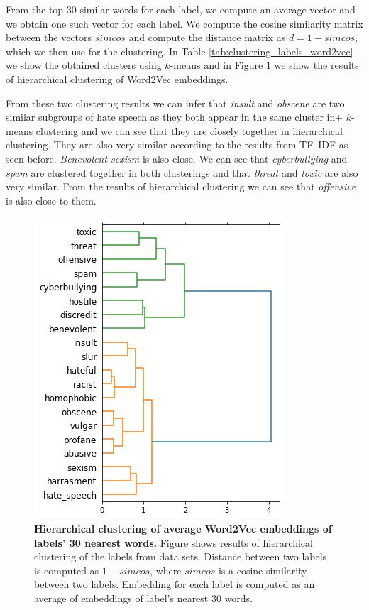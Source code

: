 \documentclass[fleqn,moreauthors,10pt]{ds_report}
\begin{document}
From the top 30 similar words for each label, we compute an average vector and we obtain one such vector for each label. We compute the cosine similarity matrix between the vectors $simcos$ and compute the distance matrix as $d = 1 - simcos$, which we then use for the clustering. In Table \ref{tab:clustering_labels_word2vec} we show the obtained clusters using $k$-means and in Figure \ref{fig:hier} we show the results of hierarchical clustering of Word2Vec embeddings.

From these two clustering results we can infer that \textit{insult} and \textit{obscene} are two similar subgroups of hate speech as they both appear in the same cluster in+ $k$-means clustering and we can see that they are closely together in hierarchical clustering. They are also very similar according to the results from TF--IDF as seen before. \textit{Benevolent sexism} is also close. We can see that \textit{cyberbullying} and \textit{spam} are clustered together in both clusterings and that \textit{threat} and \textit{toxic} are also very similar. From the results of hierarchical clustering we can see that \textit{offensive} is also close to them.

\begin{figure}[htb]\centering
	\includegraphics[width=0.6\linewidth]{hier.png}
	\caption{\textbf{Hierarchical clustering of average Word2Vec embeddings of labels' 30 nearest words.} Figure shows results of hierarchical clustering of the labels from data sets. Distance between two labels is computed as $1 - simcos$, where $simcos$ is a cosine similarity between two labels. Embedding for each label is computed as an average of embeddings of label's nearest $30$ words.}
	\label{fig:hier}
\end{figure}
\end{document}
